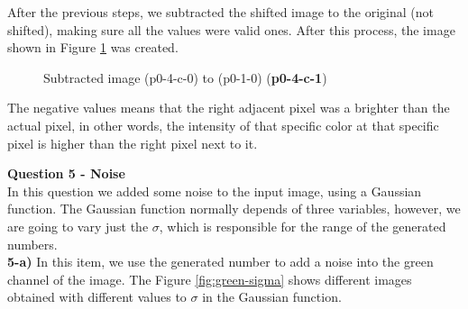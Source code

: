 \documentclass[12pt,a4paper]{article}
\begin{document}
After the previous steps, we subtracted the shifted image to the original (not shifted), making sure all the values were valid ones. After this process, the image shown in Figure \ref{fig:p0-4-c-1} was created.

\begin{figure}[!h]
	\centering
	{%
		\setlength{\fboxsep}{1pt}%
		\setlength{\fboxrule}{1pt}%
	}%
	\caption{Subtracted image (p0-4-c-0) to (p0-1-0) (\textbf{p0-4-c-1})}
	\label{fig:p0-4-c-1}
\end{figure}


The negative values means that the right adjacent pixel was a brighter than the actual pixel, in other words, the intensity of that specific color at that specific pixel is higher than the right pixel next to it.

\newpage

\textbf{Question 5 - Noise} \\

In this question we added some noise to the input image, using a Gaussian function. The Gaussian function normally depends of three variables, however, we are going to vary just the $\sigma$, which is responsible for the range of the generated numbers. \\

\textbf{5-a) }  In this item, we use the generated number to add a noise into the green channel of the image. The Figure \ref{fig:green-sigma} shows different images obtained with different values to $\sigma$ in the Gaussian function. \\
\end{document}
